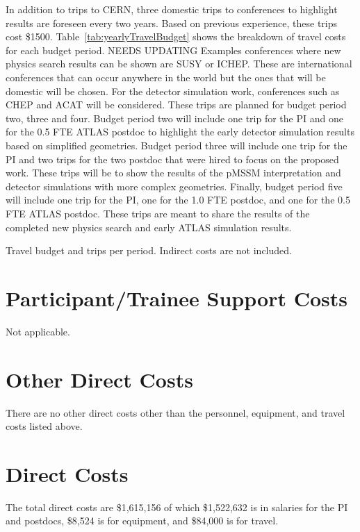 \documentclass[letter, USenglish, 11pt, subfigure]{article}
\begin{document}
In addition to trips to CERN, three domestic trips to conferences to highlight results are foreseen every two years. Based on previous experience, these trips cost \$1500. Table~\ref{tab:yearlyTravelBudget} shows the breakdown of travel costs for each budget period. {\color{red} NEEDS UPDATING Examples conferences where new physics search results can be shown are SUSY or ICHEP. These are international conferences that can occur anywhere in the world but the ones that will be domestic will be chosen. For the detector simulation work, conferences such as CHEP and ACAT will be considered. These trips are planned for budget period two, three and four. Budget period two will include one trip for the PI and one for the 0.5 FTE ATLAS postdoc to highlight the early detector simulation results based on simplified geometries. Budget period three will include one trip for the PI and two trips for the two postdoc that were hired to focus on the proposed work. These trips will be to show the results of the pMSSM interpretation and detector simulations with more complex geometries. Finally, budget period five will include one trip for the PI, one for the 1.0 FTE postdoc, and one for the 0.5 FTE ATLAS postdoc. These trips are meant to share the results of the completed new physics search and early ATLAS simulation results. }

\begin{table}[!htpb]
  \begin{center}  
    \caption{Travel budget and trips per period. Indirect costs are not included.}
    \label{tab:yearlyTravelBudget}
  
  \end{center}
\end{table}

\section{Participant/Trainee Support Costs}
\label{subsec:trainee}
Not applicable.

\section{Other Direct Costs}
\label{subsec:otherDirects}
There are no other direct costs other than the personnel, equipment, and travel costs listed above.

\section{Direct Costs}
\label{subsec:directs}
The total direct costs are \$1,615,156 of which \$1,522,632 is in salaries for the PI and postdocs, \$8,524 is for equipment, and \$84,000 is for travel.
\end{document}
